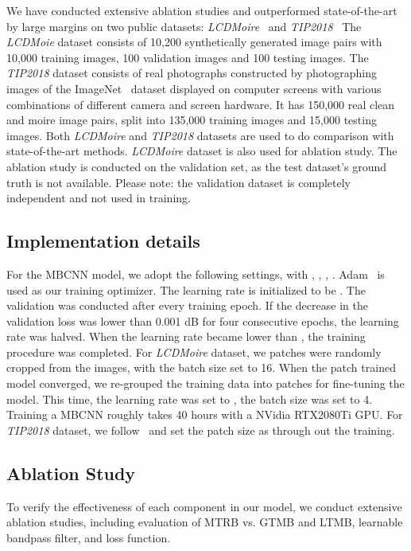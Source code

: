 \documentclass[10pt,twocolumn,letterpaper]{article}
\begin{document}
We have conducted extensive ablation studies and outperformed state-of-the-art by large margins on two public datasets: \emph{LCDMoire}~\cite{AIM19demoireDataset} and \emph{TIP2018}~\cite{sun2018moire}
The \emph{LCDMoie} dataset consists of 10,200 synthetically generated image pairs with 10,000 training images, 100 validation images and 100 testing images.
The \emph{TIP2018} dataset consists of real photographs constructed by photographing images of the ImageNet~\cite{russakovsky2015imagenet} dataset displayed on computer screens with various combinations of different camera and screen hardware. It has 150,000 real clean and moire image pairs, split into 135,000 training images and 15,000 testing images.
Both \emph{LCDMoire} and \emph{TIP2018} datasets are used to do comparison with state-of-the-art methods. \emph{LCDMoire} dataset is also used for ablation study. The ablation study is conducted on the validation set, as the test dataset's ground truth is not available. Please note: the validation dataset is completely independent and not used in training.

\subsection{Implementation details}
\label{imp details}
For the MBCNN model, we adopt the following settings, with , , , . Adam~\cite{adam} is used as our training optimizer. The learning rate is initialized to be . The validation was conducted after every training epoch. If the decrease in the validation loss was lower than 0.001 dB for four consecutive epochs, the learning rate was halved. 
When the learning rate became lower than , the training procedure was completed. 
For \emph{LCDMoire} dataset, we  patches were randomly cropped from the images, with the batch size set to 16. When the  patch trained model converged, we re-grouped the training data into  patches for fine-tuning the model. This time, the learning rate was set to , the batch size was set to 4. Training a MBCNN roughly takes 40 hours with a NVidia RTX2080Ti GPU.
For \emph{TIP2018} dataset, we follow~\cite{sun2018moire} and set the patch size as  through out the training. 

\subsection{Ablation Study}

To verify the effectiveness of each component in our model, we conduct extensive ablation studies, including evaluation of MTRB vs. GTMB and LTMB, learnable bandpass filter, and loss function.
\end{document}
